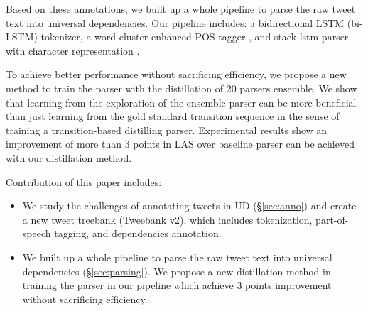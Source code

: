 \documentclass[11pt,a4paper]{article}
\newcommand{\yjcomment}[1]{\textcolor{orange}{[$_\mathrm{L}^\mathrm{Y}$#1]}}
\newcommand{\nascomment}[1]{\textcolor{blue}{[#1 ---\textsc{nas}]}}
\begin{document}

Based on these annotations, we built up a whole pipeline to parse the
raw tweet text into universal dependencies. Our pipeline includes: a
bidirectional LSTM (bi-LSTM) tokenizer, a word cluster enhanced POS
tagger \cite{owoputi-EtAl:2013:NAACL-HLT}, and stack-lstm parser
with character representation \cite{ballesteros-dyer-smith:2015:EMNLP}.

To achieve better performance without sacrificing efficiency, we propose
a new method to train the parser with the distillation 
\cite{DBLP:journals/corr/HintonVD15} of 20 parsers ensemble.
We show that learning from the exploration of the ensemble parser
can be more beneficial than just learning from the gold standard
transition sequence in the sense of training a transition-based
distilling parser. Experimental results show an improvement of more
than 3 points in LAS over baseline parser can be achieved with our
distillation method.

Contribution of this paper includes:
\begin{itemize}
\item We study the challenges of annotating tweets in UD (\S\ref{sec:anno})
and create a new tweet treebank ({\sc Tweebank v2}), which includes 
tokenization, part-of-speech tagging, and dependencies annotation.

\item We built up a whole pipeline to parse the raw tweet text into
universal dependencies (\S\ref{sec:parsing}). We propose a new distillation
method in training the parser in our pipeline which achieve 3 points improvement
without sacrificing efficiency.
\end{itemize}
\end{document}
